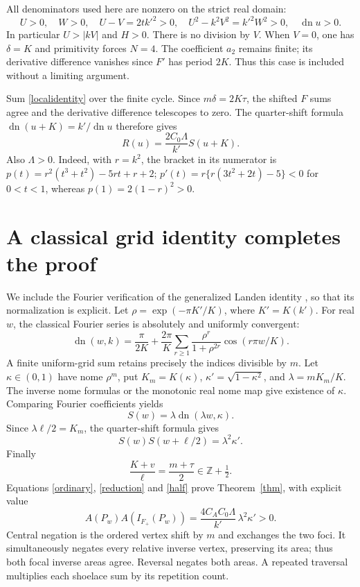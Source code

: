 \documentclass[11pt,letterpaper]{article}
\DeclareMathOperator{\dn}{dn}
\begin{document}
All denominators used here are nonzero on the strict real domain:
\[
 U>0,\quad W>0,\quad U-V=2tk'^2>0,\quad
 U^2-k^2V^2=k'^2W^2>0,\quad \dn u>0.
\]
In particular $U>|kV|$ and $H>0$. There is no division by $V$.
When $V=0$, one has $\delta=K$ and primitivity forces $N=4$.
The coefficient $a_2$ remains finite; its derivative difference
vanishes since $F'$ has period $2K$. Thus this case is included
without a limiting argument.

Sum \eqref{localidentity} over the finite cycle. Since
$m\delta=2K\tau$, the shifted $F$ sums agree and the derivative
difference telescopes to zero. The quarter-shift formula
$\dn(u+K)=k'/\dn u$ therefore gives
\begin{equation}\label{reduction}
                         R(u)=\frac{2C_0\Lambda}{k'}S(u+K).
\end{equation}
Also $\Lambda>0$. Indeed, with $r=k^2$, the bracket in its numerator
is $p(t)=r^2(t^3+t^2)-5rt+r+2$;
$p'(t)=r\{r(3t^2+2t)-5\}<0$ for $0<t<1$, whereas
$p(1)=2(1-r)^2>0$.

\section{A classical grid identity completes the proof}
We include the Fourier verification of the generalized Landen
identity \cite{landen}, so that its normalization is explicit.
Let $\rho=\exp(-\pi K'/K)$, where $K'=K(k')$.
For real $w$, the classical Fourier series
\cite[Eq.~22.11.3]{dlmf} is absolutely and uniformly convergent:
\[
 \dn(w,k)=\frac{\pi}{2K}+
 \frac{2\pi}{K}\sum_{r\ge1}\frac{\rho^r}{1+\rho^{2r}}
                        \cos(r\pi w/K).
\]
A finite uniform-grid sum retains precisely the indices divisible
by $m$. Let $\kappa\in(0,1)$ have nome $\rho^m$, put
$K_m=K(\kappa)$, $\kappa'=\sqrt{1-\kappa^2}$, and
$\lambda=mK_m/K$. The inverse nome formulas
\cite[Section~22.2]{dlmf} or the monotonic real nome map give
existence of $\kappa$. Comparing Fourier coefficients yields
\[
              S(w)=\lambda\dn(\lambda w,\kappa).
\]
Since $\lambda\ell/2=K_m$, the quarter-shift formula gives
\begin{equation}\label{half}
                         S(w)S(w+\ell/2)=\lambda^2\kappa'.
\end{equation}
Finally
\[
 \frac{K+v}{\ell}=\frac{m+\tau}{2}\in\mathbb Z+\tfrac12.
\]
Equations \eqref{ordinary}, \eqref{reduction} and \eqref{half}
prove Theorem~\ref{thm}, with explicit value
\begin{equation}\label{constant}
       A(P_w)A(I_{F_+}(P_w))
        =\frac{4C_A C_0\Lambda}{k'}\,\lambda^2\kappa'>0.
\end{equation}
Central negation is the ordered vertex shift by $m$ and exchanges
the two foci. It simultaneously negates every relative inverse
vertex, preserving its area; thus both focal inverse areas agree.
Reversal negates both areas. A repeated traversal multiplies
each shoelace sum by its repetition count.
\end{document}
